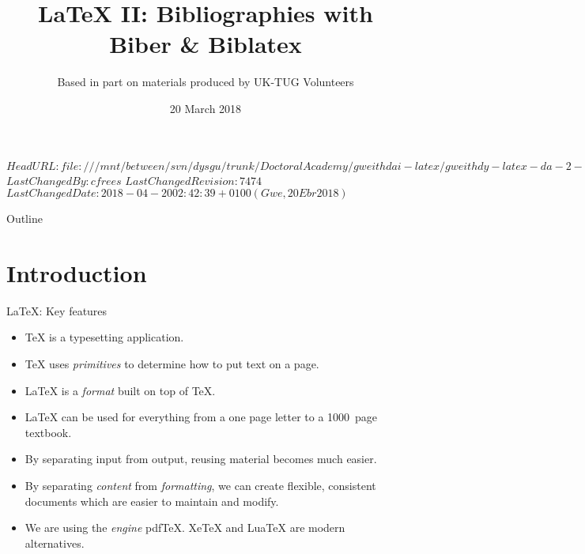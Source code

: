 \svnidlong
{$HeadURL: file:///mnt/between/svn/dysgu/trunk/DoctoralAcademy/gweithdai-latex/gweithdy-latex-da-2-biblatex/training.tex $}
{$LastChangedBy: cfrees $}
{$LastChangedRevision: 7474 $}
{$LastChangedDate: 2018-04-20 02:42:39 +0100 (Gwe, 20 Ebr 2018) $}



\title{\LaTeX{} II: Bibliographies with Biber \& Biblatex}
\subtitle{Based in part on materials produced by UK-TUG Volunteers}
\date{ 20 March 2018}




\begin{frame}
  \titlepage
\end{frame}

\maketitle


\tableofcontents

%
{
  \begin{frame}{Outline}
    \tableofcontents
  \end{frame}
}

%

\section{Introduction}

\begin{frame}{\LaTeX{}: Key features}

  \begin{itemize}
    \item \TeX{} is a typesetting application.
    \item \TeX{} uses \emph{primitives} to determine how to put text on a page.
    \item \LaTeX{} is  a \emph{format} built on top of \TeX{}.
    \item \LaTeX{} can be used for everything from a one page letter to a 1000~page textbook.
    \item By separating input from output, reusing material becomes much easier.
    \item By separating \emph{content} from \emph{formatting}, we can create flexible, consistent documents which are easier to maintain and modify.
    \item We are using the \emph{engine} pdf\TeX{}.
    Xe\TeX{} and Lua\TeX{} are modern alternatives.
  \end{itemize}

\end{frame}

